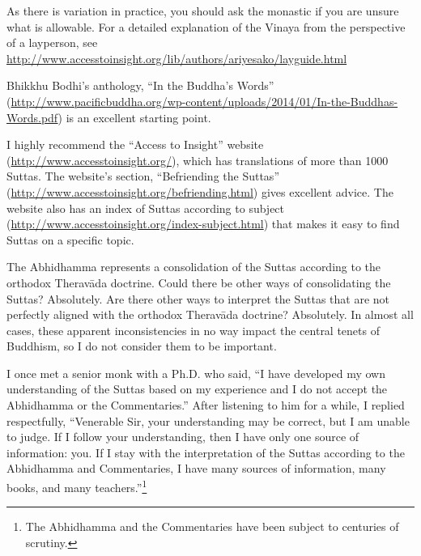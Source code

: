 As there is variation in practice, you should ask the monastic if you are unsure what is allowable. For a detailed explanation of the Vinaya from the perspective of a layperson, see \url{http://www.accesstoinsight.org/lib/authors/ariyesako/layguide.html}


Bhikkhu Bodhi’s anthology, “In the Buddha’s Words” (\url{http://www.pacificbuddha.org/wp-content/uploads/2014/01/In-the-Buddhas-Words.pdf}) is an excellent starting point. 

I highly recommend the “Access to Insight” website (\url{http://www.accesstoinsight.org/}), which has translations of more than 1000 Suttas. The website’s section, “Befriending the Suttas” (\url{http://www.accesstoinsight.org/befriending.html}) gives excellent advice. The website also has an index of Suttas according to subject (\url{http://www.accesstoinsight.org/index-subject.html}) that makes it easy to find Suttas on a specific topic.


The Abhidhamma represents a consolidation of the Suttas according to the orthodox Theravāda doctrine. Could there be other ways of consolidating the Suttas? Absolutely. Are there other ways to interpret the Suttas that are not perfectly aligned with the orthodox Theravāda doctrine? Absolutely. In almost all cases, these apparent inconsistencies in no way impact the central tenets of Buddhism, so I do not consider them to be important.

I once met a senior monk with a Ph.D. who said, “I have developed my own understanding of the Suttas based on my experience and I do not accept the Abhidhamma or the Commentaries.” After listening to him for a while, I replied respectfully, “Venerable Sir, your understanding may be correct, but I am unable to judge. If I follow your understanding, then I have only one source of information: you. If I stay with the interpretation of the Suttas according to the Abhidhamma and Commentaries, I have many sources of information, many books, and many teachers.”\footnote{The Abhidhamma and the Commentaries have been subject to centuries of scrutiny.}


